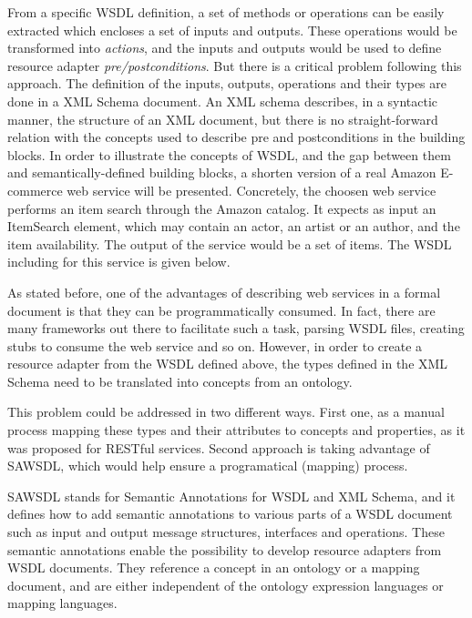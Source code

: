 \documentclass{fast_latex}
\begin{document}
From a specific WSDL definition, a set of methods or operations can be easily extracted which encloses a set of inputs and outputs. These operations would be transformed into \emph{actions}, and the inputs and outputs would be used to define resource adapter \emph{pre/postconditions}. But there is a critical problem following this approach. The definition of the inputs, outputs, operations and their types are done in a XML Schema document. An XML schema describes, in a syntactic manner, the structure of an XML document, but there is no straight-forward relation with the concepts used to describe pre and postconditions in the building blocks. In order to illustrate the concepts of WSDL, and the gap between them and semantically-defined building blocks, a shorten version of a real Amazon E-commerce web service will be presented. Concretely, the choosen web service performs an item search through the Amazon catalog. It expects as input an ItemSearch element, which may contain an actor, an artist or an author, and the item availability. The output of the service would be a set of items. The WSDL including for this service is given below.

\singlespacing
\begin{small}

\end{small}
\doublespacing

As stated before, one of the advantages of describing web services in a formal document is that they can be programmatically consumed. In fact, there are many frameworks out there to facilitate such a task, parsing WSDL files, creating stubs to consume the web service and so on. However, in order to create a resource adapter from the WSDL defined above, the types defined in the XML Schema need to be translated into concepts from an ontology.

This problem could be addressed in two different ways. First one, as a manual process mapping these types and their attributes to concepts and properties, as it was proposed for RESTful services. Second approach is taking advantage of SAWSDL, which would help ensure a programatical (mapping) process.

SAWSDL \cite{sawsdl} stands for Semantic Annotations for WSDL and XML Schema, and it defines how to add semantic annotations to various parts of a WSDL document such as input and output message structures, interfaces and operations. These semantic annotations enable the possibility to develop resource adapters from WSDL documents. They reference a concept in an ontology or a mapping document, and are either independent of the ontology expression languages or mapping languages.
\end{document}
